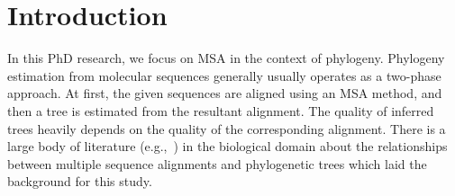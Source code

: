 \section{Introduction}
In this PhD research, we focus on MSA in the context of phylogeny. Phylogeny estimation from molecular sequences generally usually operates as a two-phase approach. At first, the given sequences are aligned using an MSA method, and then a tree is estimated from the resultant alignment. The quality of inferred trees heavily depends on the quality of the corresponding alignment. There is a large body of literature (e.g.,~\cite{jordan2011effects, chang2014tcs, lake1991order, croan1997evolution, ogden2006multiple, wu2012accounting}) in the biological domain about the relationships between multiple sequence alignments and phylogenetic trees which laid the background for this study. 